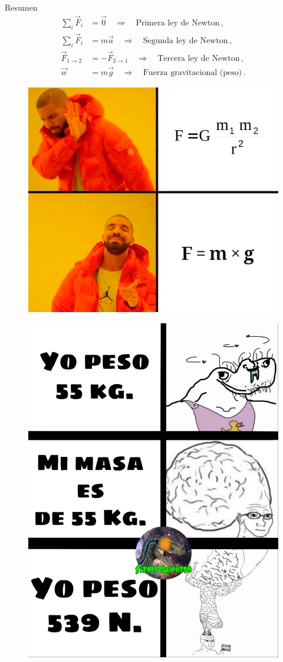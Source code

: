 \begin{frame}{Resumen}
    \begin{align}
        \sum_i \vec{F}_i&=\vec{0}\quad\Rightarrow\quad \text{Primera ley de Newton}\,,\\
        \sum_i \vec{F}_i&=m\vec{a}\quad\Rightarrow\quad \text{Segunda ley de Newton}\,,\\
        \vec{F}_{1\rightarrow2}&=-\vec{F}_{2\rightarrow1}\quad\Rightarrow\quad \text{Tercera ley de Newton}\,,\\
        \vec{w}&=m\vec{g}\quad\Rightarrow\quad \text{Fuerza gravitacional (peso)}\,.
    \end{align}
\end{frame}

\begin{frame}
    \begin{figure}
        \centering
        \includegraphics[width=0.5\linewidth]{figures/fgrav-meme.png}
    \end{figure}
\end{frame}

\begin{frame}
    \begin{figure}
        \centering
        \includegraphics[width=0.5\linewidth]{figures/peso-meme.png}
    \end{figure}
\end{frame}

